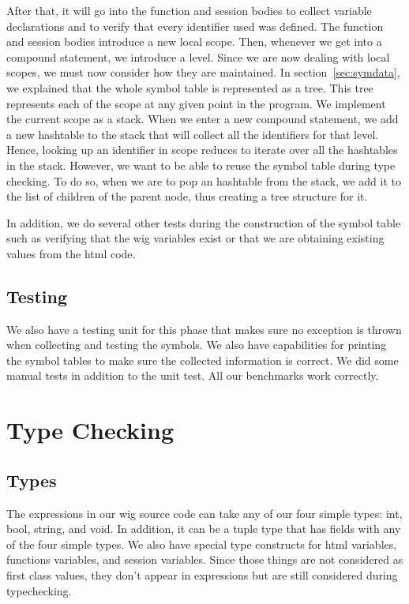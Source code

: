 \documentclass{WigReport}
\begin{document}
After that, it will go into the function and session bodies to collect variable declarations and to verify that every identifier used was defined. The function and session bodies introduce a new local scope. Then, whenever we get into a compound statement, we introduce a level. Since we are now dealing with local scopes, we must now consider how they are maintained. In section~\ref{sec:symdata}, we explained that the whole symbol table is represented as a tree. This tree represents each of the scope at any given point in the program. We implement the current scope as a stack. When we enter a new compound statement, we add a new hashtable to the stack that will collect all the identifiers for that level. Hence, looking up an identifier in scope reduces to iterate over all the hashtables in the stack. However, we want to be able to reuse the symbol table during type checking. To do so, when we are to pop an hashtable from the stack, we add it to the list of children of the parent node, thus creating a tree structure for it. 

In addition, we do several other tests during the construction of the symbol table such as verifying that the wig variables exist or that we are obtaining existing values from the html code.

\subsection{Testing}
We also have a testing unit for this phase that makes sure no exception is thrown when collecting and testing the symbols. We also have capabilities for printing the symbol tables to make sure the collected information is correct. We did some manual tests in addition to the unit test. All our benchmarks work correctly.

\section{Type Checking}
\subsection{Types}
The expressions in our wig source code can take any of our four simple types: int, bool, string, and void. In addition, it can be a tuple type that has fields with any of the four simple types. We also have special type constructs for html variables, functions variables, and session variables. Since those things are not considered as first class values, they don't appear in expressions but are still considered during typechecking.
\end{document}
